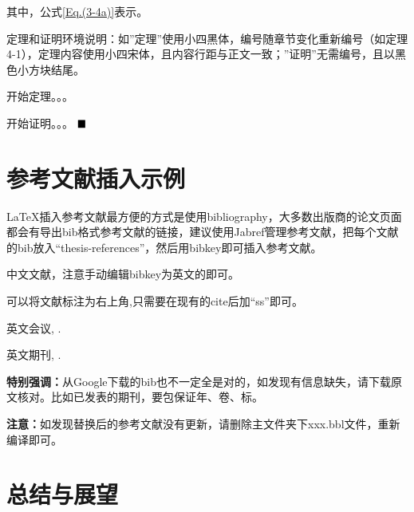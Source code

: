 其中，公式\ref{Eq.(3-4a)}表示。

定理和证明环境说明：如”定理”使用小四黑体，编号随章节变化重新编号（如定理4-1），定理内容使用小四宋体，且内容行距与正文一致；”证明”无需编号，且以黑色小方块结尾。

\begin{theorem}\label{theorem1}
	\setlength{\baselineskip}{20pt}         %
	\renewcommand{\baselinestretch}{1.0}   %
	开始定理。。。
\end{theorem}

\begin{proof*} %
	\setlength{\baselineskip}{20pt}         %
	\renewcommand{\baselinestretch}{1.0}   %
	开始证明。。。
	$\hfill\blacksquare$ %
\end{proof*}

\newpage

\section{参考文献插入示例}

LaTeX\cite{lamport1994latex}插入参考文献最方便的方式是使用bibliography\cite{pritchard1969statistical}，大多数出版商的论文页面都会有导出bib格式参考文献的链接，建议使用Jabref管理参考文献，把每个文献的bib放入``thesis-references''，然后用bibkey即可插入参考文献。

中文文献\cite{zh-book-1}，注意手动编辑bibkey为英文的即可。

可以将文献标注为右上角,只需要在现有的cite后加“ss”即可。

英文会议\cite{Kraus2021Current}, \cite{WuYangLuEtAl2021}.

英文期刊\cite{LuoZengYuanEtAl2016}, \cite{Wu2022Boosting}.


\textbf{特别强调：}从Google下载的bib也不一定全是对的，如发现有信息缺失，请下载原文核对。比如已发表的期刊，要包保证年、卷、标。

\textbf{注意：}如发现替换后的参考文献没有更新，请删除主文件夹下xxx.bbl文件，重新编译即可。

\newpage


\section{总结与展望}

